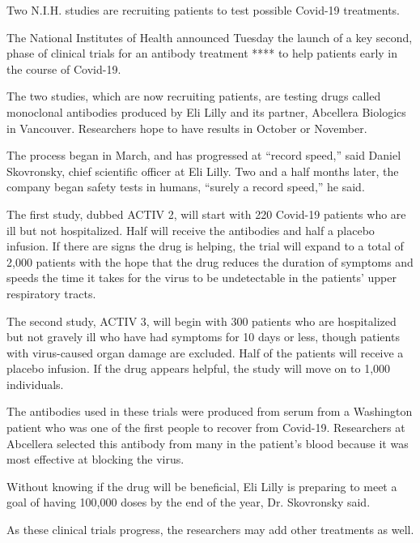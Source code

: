 Two N.I.H. studies are recruiting patients to test possible Covid-19
treatments.

The National Institutes of Health announced Tuesday the launch of a key
second, phase of clinical trials for an antibody treatment **** to help
patients early in the course of Covid-19.

The two studies, which are now recruiting patients, are testing drugs
called monoclonal antibodies produced by Eli Lilly and its partner,
Abcellera Biologics in Vancouver. Researchers hope to have results in
October or November.

The process began in March, and has progressed at ``record speed,'' said
Daniel Skovronsky, chief scientific officer at Eli Lilly. Two and a half
months later, the company began safety tests in humans, ``surely a
record speed,'' he said.

The first study, dubbed ACTIV 2, will start with 220 Covid-19 patients
who are ill but not hospitalized. Half will receive the antibodies and
half a placebo infusion. If there are signs the drug is helping, the
trial will expand to a total of 2,000 patients with the hope that the
drug reduces the duration of symptoms and speeds the time it takes for
the virus to be undetectable in the patients' upper respiratory tracts.

The second study, ACTIV 3, will begin with 300 patients who are
hospitalized but not gravely ill who have had symptoms for 10 days or
less, though patients with virus-caused organ damage are excluded. Half
of the patients will receive a placebo infusion. If the drug appears
helpful, the study will move on to 1,000 individuals.

The antibodies used in these trials were produced from serum from a
Washington patient who was one of the first people to recover from
Covid-19. Researchers at Abcellera selected this antibody from many in
the patient's blood because it was most effective at blocking the virus.

Without knowing if the drug will be beneficial, Eli Lilly is preparing
to meet a goal of having 100,000 doses by the end of the year, Dr.
Skovronsky said.

As these clinical trials progress, the researchers may add other
treatments as well.

\hypertarget{-7}{%
\subsection{}\label{-7}}

